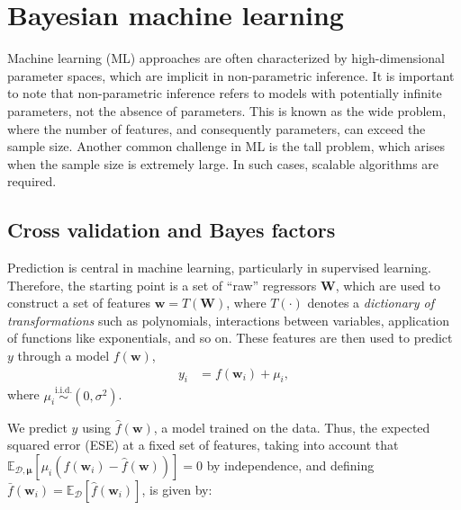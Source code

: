 \chapter{Bayesian machine learning}\label{chap13}

Machine learning (ML) approaches are often characterized by high-dimensional parameter spaces, which are implicit in non-parametric inference. It is important to note that non-parametric inference refers to models with potentially infinite parameters, not the absence of parameters. This is known as the wide problem, where the number of features, and consequently parameters, can exceed the sample size. Another common challenge in ML is the tall problem, which arises when the sample size is extremely large. In such cases, scalable algorithms are required.

\section{Cross validation and Bayes factors}\label{sec13_1}
Prediction is central in machine learning, particularly in supervised learning. Therefore, the starting point is a set of ``raw'' regressors \( \mathbf{W} \), which are used to construct a set of features \( \mathbf{w} = T(\mathbf{W}) \), where \( T(\cdot) \) denotes a \textit{dictionary of transformations} such as polynomials, interactions between variables, application of functions like exponentials, and so on. These features are then used to predict $y$ through a model $f(\mathbf{w})$,
\begin{align*}
	y_i &= f(\mathbf{w}_i) + \mu_i,
\end{align*}
where $\mu_i \stackrel{\text{i.i.d.}}{\sim} (0, \sigma^2)$.

We predict \( y \) using \( \hat{f}(\mathbf{w}) \), a model trained on the data. Thus, the expected squared error (ESE) at a fixed set of features, taking into account that \( \mathbb{E}_{\mathcal{D},\boldsymbol{\mu}} \left[\mu_i(f(\mathbf{w}_i) - \hat{f}(\mathbf{w}))\right] = 0 \) by independence, and defining \( \bar{f}(\mathbf{w}_i) = \mathbb{E}_{\mathcal{D}}[\hat{f}(\mathbf{w}_i)] \), is given by:

